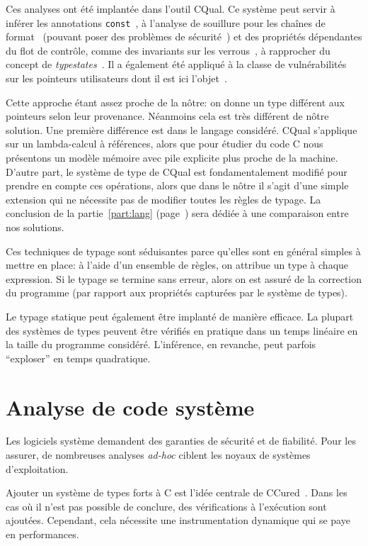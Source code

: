 Ces analyses ont été implantée dans l'outil CQual. Ce système peut servir à
inférer les annotations \texttt{const}~\cite{pldi99}, à l'analyse de souillure
pour les chaînes de format~\cite{usenix01} (pouvant poser des problèmes de
sécurité~\cite{format-string-attacks}) et des propriétés dépendantes du flot de
contrôle, comme des invariants sur les verrous~\cite{pldi02}, à rapprocher du
concept de \emph{typestates}~\cite{tse12-typestate}. Il a également été appliqué
à la classe de vulnérabilités sur les pointeurs utilisateurs dont il est ici
l'objet~\cite{cquk-usenix04}.

Cette approche étant assez proche de la nôtre: on donne un type différent aux
pointeurs selon leur provenance. Néanmoins cela est très différent de nôtre
solution. Une première différence est dans le langage considéré. CQual
s'applique sur un lambda-calcul à références, alors que pour étudier du code C
nous présentons un modèle mémoire avec pile explicite plus proche de la machine.
D'autre part, le système de type de CQual est fondamentalement modifié pour
prendre en compte ces opérations, alors que dans le nôtre il s'agit d'une simple
extension qui ne nécessite pas de modifier toutes les règles de typage. La
conclusion de la partie~\ref{part:lang} (page~\pageref{cha:ccl2}) sera dédiée à
une comparaison entre nos solutions.

Ces techniques de typage sont séduisantes parce qu'elles sont en général simples
à mettre en place: à l'aide d'un ensemble de règles, on attribue un type à
chaque expression. Si le typage se termine sans erreur, alors on est assuré de
la correction du programme (par rapport aux propriétés capturées par le système
de types).

Le typage statique peut également être implanté de manière efficace. La plupart
des systèmes de types peuvent être vérifiés en pratique dans un temps linéaire
en la taille du programme considéré. L'inférence, en revanche, peut parfois
``exploser'' en temps quadratique. %

\section{Analyse de code système}

Les logiciels système demandent des garanties de sécurité et de fiabilité. Pour
les assurer, de nombreuses analyses \emph{ad-hoc} ciblent les noyaux de systèmes
d'exploitation.

Ajouter un système de types forts à C est l'idée centrale de
CCured~\cite{ccured-toplas}. Dans les cas où il n'est pas possible de conclure,
des vérifications à l'exécution sont ajoutées. Cependant, cela nécessite une
instrumentation dynamique qui se paye en performances.


